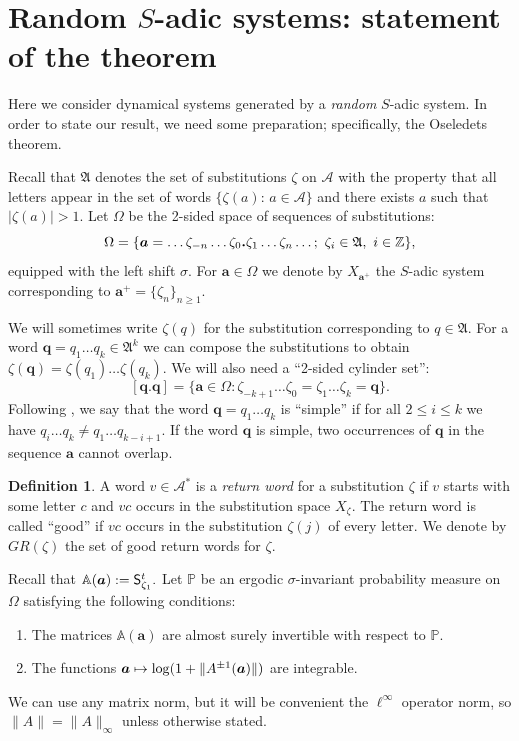 \documentclass[10pt]{amsart}
\let\mathcal\mathscr
\def\mto{\mathchoice{\longmapsto}{\mapsto}{\mapsto}{\mapsto}}
\newcommand{\sep}{:}
\theoremstyle{plain}
\theoremstyle{definition}
\newtheorem{defi}[theorem]{Definition}
\newcommand\bom{{\boldsymbol a}}\let\ba\bom
\newcommand\bq{{\boldsymbol q}}
\let\Om\Omega
\let\sig\sigma
\newcommand\FrA{\mathfrak{A}}
\newcommand\Ak{\mathcal{A}}
\newcommand\Aa{\mathbb{A}}
\newcommand{\Z}{\mathbb{Z}}
\renewcommand{\P}{\mathbb{P}}
\newcommand\Sf{{\sf S}}
\begin{document}
\section{Random \texorpdfstring{$S$}{S}-adic systems: statement of the theorem}\label{sec:3}

Here we consider dynamical systems generated by a \emph{random} $S$-adic system. In order to state our result, we need some preparation; specifically, the Oseledets theorem.

Recall that $\FrA$ denotes the set of substitutions $\zeta$ on $\Ak$ with the property that all letters appear in the set of words $\{\zeta(a):\,a\in \Ak\}$ and there exists $a$ such that $|\zeta(a)|>1$.
Let $\Om$ be the 2-sided space of sequences of substitutions:
\[
\Om = \{\bom = \ldots \zeta_{-n}\ldots\zeta_0{\text{\bf .}}\zeta_1\ldots \zeta_n\ldots;\ \zeta_i \in \FrA,\ i\in \Z\},
\]
equipped with the left shift $\sig$.
For $\bom\in\Om$ we denote by $X_{\bom^+}$ the $S$-adic system corresponding to $\bom^+=\{\zeta_n\}_{n\ge 1}$.

We will sometimes write $\zeta(q)$ for the substitution corresponding to $q\in \FrA$. For a word $\bq = q_1\ldots q_k\in \FrA^k$ we can compose the substitutions to obtain
$\zeta(\bq) = \zeta(q_1)\ldots \zeta(q_k)$.
We will also need a ``2-sided cylinder set'':\vspace*{-3pt}
\[
[\bq.\bq] = \{\bom\in \Om\sep \zeta_{-k+1}\ldots\zeta_0 = \zeta_1\ldots\zeta_k = \bq\}.
\]
Following \cite{BufGur}, we say that the word $\bq = q_1\ldots q_k$ is ``simple'' if for all $2 \le i \le k$ we have $q_i\ldots q_k \ne q_1\ldots q_{k-i+1}$. If the word $\bq$ is simple, two occurrences of $\bq$ in the sequence
$\bom$ cannot overlap.

\begin{defi}
A word $v\in \Ak^*$ is a \emph{return word} for a substitution $\zeta$ if $v$ starts with some letter $c$ and $vc$ occurs in the substitution space $X_\zeta$. The return word is called ``good'' if $vc$ occurs in the substitution $\zeta(j)$ of every letter. We denote by $GR(\zeta)$ the set of good return words for $\zeta$.
\end{defi}

Recall that
$
\Aa(\bom) := \Sf^t_{\zeta_1}.
$
Let $\P$ be an ergodic $\sig$-invariant probability measure on $\Om$ satisfying the following conditions:
\begin{enumerate}\renewcommand{\theenumi}{C\arabic{enumi}}
\item\label{C1}
The matrices $\Aa(\bom)$ are almost surely invertible with respect to $\P$.

\item\label{C2}
The functions $\bom\mto \log(1+ \|A^{\pm 1}(\bom)\|)$ are integrable.
\end{enumerate}
We can use any matrix norm, but it will be convenient the $\ell^\infty$ operator norm, so
$\|A\|=\|A\|_\infty$ unless otherwise stated.
\end{document}
